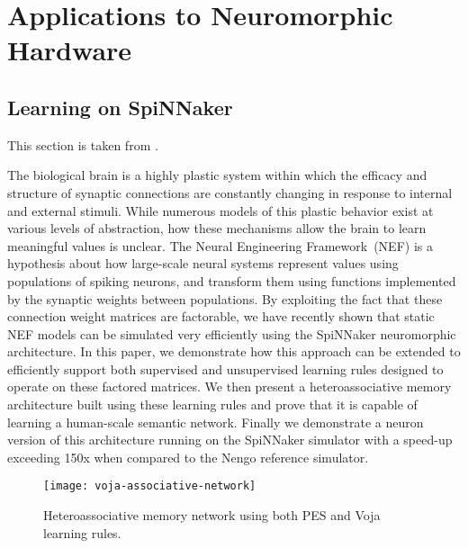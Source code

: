 \chapter{Applications to Neuromorphic Hardware}
\label{chapt:results}

\section{Learning on SpiNNaker}
\label{sec:learn-spinnaker}

This section is taken from \citep{knight2016}.

The biological brain is a highly plastic system within which the efficacy and structure of synaptic connections are constantly changing in response to internal and external stimuli.
While numerous models of this plastic behavior exist at various levels of abstraction, how these mechanisms allow the brain to learn meaningful values is unclear.
The Neural Engineering Framework~(NEF) is a hypothesis about how large-scale neural systems represent values using populations of spiking neurons, and transform them using functions implemented by the synaptic weights between populations.
By exploiting the fact that these connection weight matrices are factorable, we have recently shown that static NEF models can be simulated very efficiently using the SpiNNaker neuromorphic architecture.
In this paper, we demonstrate how this approach can be extended to efficiently support both supervised and unsupervised learning rules designed to operate on these factored matrices.
We then present a heteroassociative memory architecture built using these learning rules and prove that it is capable of learning a human-scale semantic network.
Finally we demonstrate a  neuron version of this architecture running on the SpiNNaker simulator with a speed-up exceeding 150x when compared to the Nengo reference simulator.

\begin{figure}
  \centering
  \texttt{[image: voja-associative-network]}
  \caption{Heteroassociative memory network using both PES and Voja learning rules.}
  \label{fig:voja-associative-network}
\end{figure}

